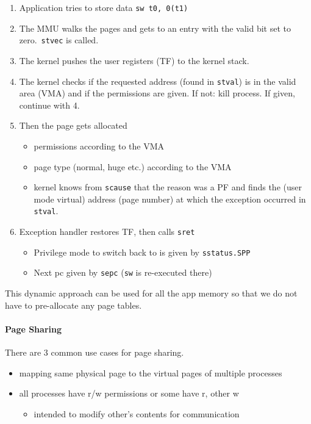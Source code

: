 \begin{enumerate}
    \item Application tries to store data
          \texttt{sw t0, 0(t1)}
    \item The MMU walks the pages and gets to an entry with the valid bit set to zero.~\texttt{stvec} is called.
    \item The kernel pushes the user registers (TF) to the kernel stack.
    \item The kernel checks if the requested address (found in \texttt{stval}) is in the valid area (VMA) and if the permissions are given. If not: kill process. If given, continue with 4.
    \item Then the page gets allocated
          \begin{itemize}
              \item permissions according to the VMA
              \item page type (normal, huge etc.) according to the VMA
              \item kernel knows from \texttt{scause} that the reason was a PF and finds the (user mode virtual) address (page number) at which the exception occurred in \texttt{stval}.
          \end{itemize}
    \item Exception handler restores TF, then calls \texttt{sret}
    \begin{itemize}
        \item Privilege mode to switch back to is given by \texttt{sstatus.SPP}
        \item Next pc given by \texttt{sepc} (\texttt{sw} is re-executed there)
    \end{itemize}
\end{enumerate}

\newpar{}

This dynamic approach can be used for all the app memory so that we do not have to pre-allocate any page tables.

\paragraph{Page Sharing}
There are 3 common use cases for page sharing.

\newpar{}

\begin{itemize}
    \item mapping same physical page to the virtual pages of multiple processes
    \item all processes have r/w permissions or some have r, other w
          \begin{itemize}
              \item intended to modify other's contents for communication
          \end{itemize}
\end{itemize}

